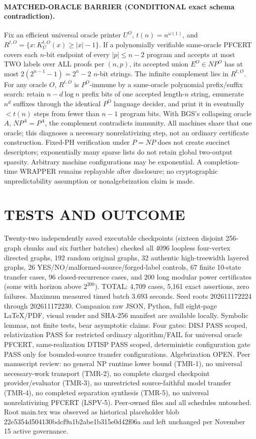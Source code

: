 \documentclass[11pt]{article}
\begin{document}
\paragraph{MATCHED-ORACLE BARRIER (CONDITIONAL exact schema contradiction).}
Fix an efficient universal oracle printer $U^O$, $t(n)=n^{\omega(1)}$, and $R^{t,O}=\{x:K_U^{t,O}(x)\ge |x|-1\}$. If a polynomially verifiable same-oracle PFCERT covers each $n$-bit endpoint of every $|p|\le n-2$ program and accepts at most TWO labels over ALL proofs per $(n,p)$, its accepted union $E^O\in NP^O$ has at most $2(2^{n-1}-1)=2^n-2$ $n$-bit strings. The infinite complement lies in $R^{t,O}$. For any oracle $O$, $R^{t,O}$ is $P^O$-immune by a same-oracle polynomial prefix/suffix search: retain $n-d\log n$ prefix bits of one accepted length-$n$ string, enumerate $n^d$ suffixes through the identical $P^O$ language decider, and print it in eventually $<t(n)$ steps from fewer than $n-1$ program bits. With BGS's collapsing oracle $A$, $NP^A=P^A$, the complement contradicts immunity. All machines share that one oracle; this diagnoses a necessary nonrelativizing step, not an ordinary certificate construction. Fixed-PH verification under $P=NP$ does not create succinct descriptors; exponentially many sparse lists do not retain global two-output sparsity. Arbitrary machine configurations may be exponential. A completion-time WRAPPER remains replayable after disclosure; no cryptographic unpredictability assumption or nonalgebrization claim is made.
\section{TESTS AND OUTCOME}
Twenty-two independently saved executable checkpoints (sixteen disjoint 256-graph chunks and six further batches) checked all 4096 loopless four-vertex directed graphs, 192 random original graphs, 32 authentic high-treewidth layered graphs, 26 YES/NO/malformed-source/forged-label controls, 67 finite 10-state transfer cases, 96 closed-recurrence cases, and 200 long modular power certificates (some with horizon above $2^{200}$). TOTAL: 4,709 cases, 5,161 exact assertions, zero failures. Maximum measured timed batch 3.693 seconds. Seed roots 202611172224 through 202611172230. Companion raw JSON, Python, full eight-page LaTeX/PDF, visual render and SHA-256 manifest are available locally. Symbolic lemmas, not finite tests, bear asymptotic claims. Four gates: DISJ PASS scoped, relativization PASS for restricted ordinary algorithm/FAIL for universal oracle PFCERT, same-realization DTISP PASS scoped, deterministic configuration gate PASS only for bounded-source transfer configurations. Algebrization OPEN. Peer manuscript review: no general NP runtime lower bound (TMR-1), no universal necessary-work transport (TMR-2), no complete charged checkpoint provider/evaluator (TMR-3), no unrestricted source-faithful model transfer (TMR-4), no completed separation synthesis (TMR-5), no universal nonrelativizing PFCERT (LSPV-5). Peer-owned files and all schedules untouched. Root main.tex was observed as historical placeholder blob 22e5354d504130bdcf9a1b2abe1b315e0d42f06a and left unchanged per November 15 active governance.
\end{document}

